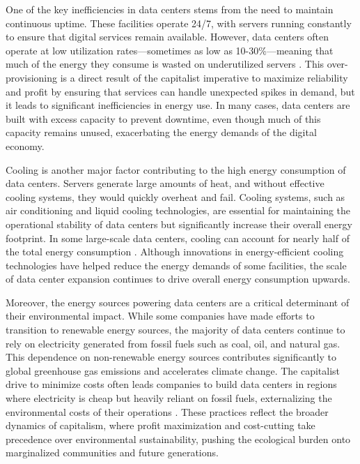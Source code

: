 \begin{refsection}
One of the key inefficiencies in data centers stems from the need to maintain continuous uptime. These facilities operate 24/7, with servers running constantly to ensure that digital services remain available. However, data centers often operate at low utilization rates—sometimes as low as 10-30\%—meaning that much of the energy they consume is wasted on underutilized servers \cite[pp.~45-47]{glanz2012}. This over-provisioning is a direct result of the capitalist imperative to maximize reliability and profit by ensuring that services can handle unexpected spikes in demand, but it leads to significant inefficiencies in energy use. In many cases, data centers are built with excess capacity to prevent downtime, even though much of this capacity remains unused, exacerbating the energy demands of the digital economy.

Cooling is another major factor contributing to the high energy consumption of data centers. Servers generate large amounts of heat, and without effective cooling systems, they would quickly overheat and fail. Cooling systems, such as air conditioning and liquid cooling technologies, are essential for maintaining the operational stability of data centers but significantly increase their overall energy footprint. In some large-scale data centers, cooling can account for nearly half of the total energy consumption \cite[pp.~85-87]{smil2018}. Although innovations in energy-efficient cooling technologies have helped reduce the energy demands of some facilities, the scale of data center expansion continues to drive overall energy consumption upwards.

Moreover, the energy sources powering data centers are a critical determinant of their environmental impact. While some companies have made efforts to transition to renewable energy sources, the majority of data centers continue to rely on electricity generated from fossil fuels such as coal, oil, and natural gas. This dependence on non-renewable energy sources contributes significantly to global greenhouse gas emissions and accelerates climate change. The capitalist drive to minimize costs often leads companies to build data centers in regions where electricity is cheap but heavily reliant on fossil fuels, externalizing the environmental costs of their operations \cite[pp.~50-52]{foster2011}. These practices reflect the broader dynamics of capitalism, where profit maximization and cost-cutting take precedence over environmental sustainability, pushing the ecological burden onto marginalized communities and future generations.


\end{refsection}
